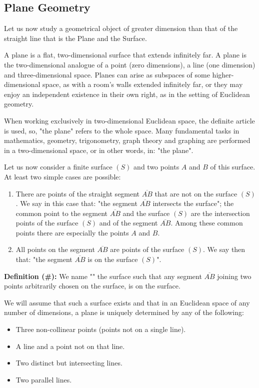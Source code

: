 	\pagebreak
	\subsection{Plane Geometry}
	Let us now study a geometrical object of greater dimension than that of the straight line that is the Plane and the Surface.
	
	A plane is a flat, two-dimensional surface that extends infinitely far. A plane is the two-dimensional analogue of a point (zero dimensions), a line (one dimension) and three-dimensional space. Planes can arise as subspaces of some higher-dimensional space, as with a room's walls extended infinitely far, or they may enjoy an independent existence in their own right, as in the setting of Euclidean geometry.
	
	When working exclusively in two-dimensional Euclidean space, the definite article is used, so, "the plane" refers to the whole space. Many fundamental tasks in mathematics, geometry, trigonometry, graph theory and graphing are performed in a two-dimensional space, or in other words, in: "the plane".
	
	Let us now consider a finite surface $(S)$ and two points $A$ and $B$ of this surface. At least two simple cases are possible:
	
	\begin{enumerate}
		\item There are points of the straight segment $\overline{AB}$ that are not on the surface $(S)$. We say in this case that: "the segment $\overline{AB}$ intersects the surface"; the common point to the segment $\overline{AB}$ and the surface $(S)$ are the intersection points of the surface $(S)$ and of the segment $\overline{AB}$. Among these common points there are especially the points $A$ and $B$.
		
		\item All points on the segment $\overline{AB}$ are points of  the surface $(S)$. We say then that: "the segment $\overline{AB}$ is on the surface $(S)$".
	\end{enumerate}

	\textbf{Definition (\#\mydef):} We name "" the surface such that any segment $\overline{AB}$ joining two points arbitrarily chosen on the surface, is on the surface.
	
	We will assume that such a surface exists and that in an Euclidean space of any number of dimensions, a plane is uniquely determined by any of the following:	
	\begin{itemize}
		\item Three non-collinear points (points not on a single line).
		\item A line and a point not on that line.
		\item Two distinct but intersecting lines.
		\item Two parallel lines.
	\end{itemize}
	
